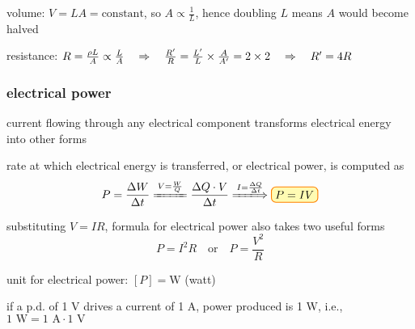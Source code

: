 
\sol volume: $V=LA = \text{constant}$, so $A \propto \frac{1}{L}$, hence doubling $L$ means $A$ would become halved

\vspace*{0.3em} resistance: $R = \frac{\rho L}{A} \propto \frac{L}{A} \quad \Rightarrow \quad \frac{R'}{R}  = \frac{L'}{L} \times \frac{A}{A'} = 2 \times 2 \quad \Rightarrow \quad R' = 4R $ \eoe

\subsubsection{electrical power}

current flowing through any electrical component transforms electrical energy into other forms

rate at which electrical energy is transferred, or electrical power, is computed as
\begin{equation*}
P = \frac{\Delta W}{\Delta  t} \xlongequal{V=\frac{W}{Q}} \frac{\Delta Q \cdot V}{\Delta t} \xLongrightarrow{I = \frac{\Delta Q}{\Delta t}} \boxed{P=IV}
\end{equation*}

substituting $V=IR$, formula for electrical power also takes two useful forms
\begin{equation*}
\boxed{P=I^2 R} \quad \text{or} \quad \boxed{P=\frac{V^2}{R}}
\end{equation*}

\cmt unit for electrical power: $[P] = \text{W}$ (watt)

if a p.d. of 1 V drives a current of 1 A, power produced is 1 W, i.e., $1 \text{ W} = 1 \text{ A} \cdot 1 \text{ V}$



%




